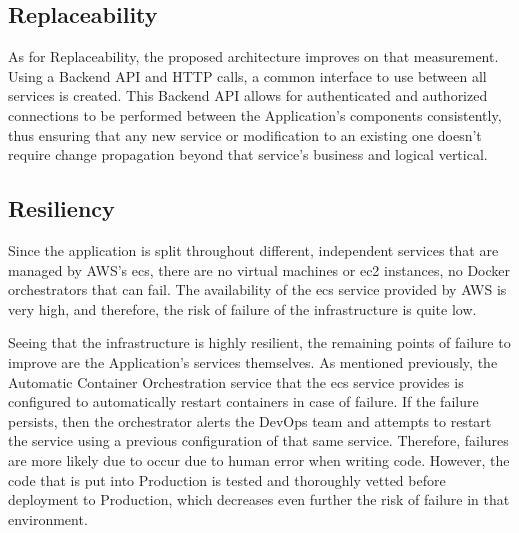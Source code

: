 
\subsection{Replaceability}\label{methodology:sss:replaceability-fix}

As for Replaceability, the proposed architecture improves on that measurement. Using a Backend API and HTTP calls, a common interface to use between all services is created. This Backend API allows for authenticated and authorized connections to be performed between the Application's components consistently, thus ensuring that any new service or modification to an existing one doesn't require change propagation beyond that service's business and logical vertical. 

\subsection{Resiliency}\label{methodology:sss:resiliency-fix}

Since the application is split throughout different, independent services that are managed by AWS's \gls{ecs}, there are no virtual machines or \gls{ec2} instances, no Docker orchestrators that can fail.
The availability of the \gls{ecs} service provided by AWS is very high, and therefore, the risk of failure of the infrastructure is quite low. 

Seeing that the infrastructure is highly resilient, the remaining points of failure to improve are the Application's services themselves. As mentioned previously, the Automatic Container Orchestration service that the \gls{ecs} service provides is configured to automatically restart containers in case of failure. If the failure persists, then the orchestrator alerts the DevOps team and attempts to restart the service using a previous configuration of that same service. Therefore, failures are more likely due to occur due to human error when writing code. However, the code that is put into Production is tested and thoroughly vetted before deployment to Production, which decreases even further the risk of failure in that environment.



